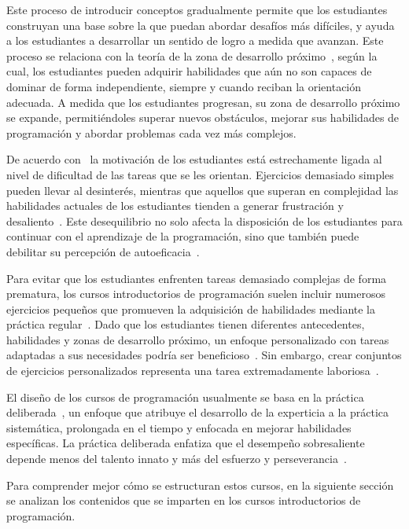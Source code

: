 Este proceso de introducir conceptos gradualmente permite que los estudiantes construyan una base sobre la que puedan abordar desafíos más difíciles, y ayuda a los estudiantes a desarrollar un sentido de logro a medida que avanzan. Este proceso se relaciona con la teoría de la zona de desarrollo próximo~\cite{vygotsky1978mind}, según la cual, los estudiantes pueden adquirir habilidades que aún no son capaces de dominar de forma independiente, siempre y cuando reciban la orientación adecuada. A medida que los estudiantes progresan, su zona de desarrollo próximo se expande, permitiéndoles superar nuevos obstáculos, mejorar sus habilidades de programación y abordar problemas cada vez más complejos.

De acuerdo con~\cite{rosenzweig2019expectancy} la motivación de los estudiantes está estrechamente ligada al nivel de dificultad de las tareas que se les orientan. Ejercicios demasiado simples pueden llevar al desinterés, mientras que aquellos que superan en complejidad las habilidades actuales de los estudiantes tienden a generar frustración y desaliento~\cite{rosenzweig2019expectancy}. Este desequilibrio no solo afecta la disposición de los estudiantes para continuar con el aprendizaje de la programación, sino que también puede debilitar su percepción de autoeficacia~\cite{bandura1977self}.

Para evitar que los estudiantes enfrenten tareas demasiado complejas de forma prematura, los cursos introductorios de programación suelen incluir numerosos ejercicios pequeños que promueven la adquisición de habilidades mediante la práctica regular~\cite{vihavainen2011extreme}. Dado que los estudiantes tienen diferentes antecedentes, habilidades y zonas de desarrollo próximo, un enfoque personalizado con tareas adaptadas a sus necesidades podría ser beneficioso~\cite{leinonen2021exploring}. Sin embargo, crear conjuntos de ejercicios personalizados representa una tarea extremadamente laboriosa~\cite{lobb2016coderunner, wrenn2018whotests}.

El diseño de los cursos de programación usualmente se basa en la práctica deliberada~\cite{ericsson1993deliberate}, un enfoque que atribuye el desarrollo de la experticia a la práctica sistemática, prolongada en el tiempo y enfocada en mejorar habilidades específicas. La práctica deliberada enfatiza que el desempeño sobresaliente depende menos del talento innato y más del esfuerzo y perseverancia~\cite{ericsson1993deliberate}.

Para comprender mejor cómo se estructuran estos cursos, en la siguiente sección se analizan los contenidos que se imparten en los cursos introductorios de programación.

